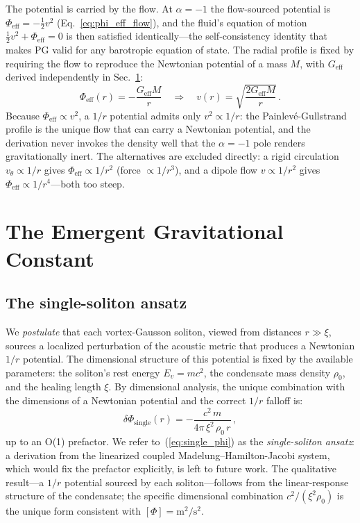 \documentclass[12pt, a4paper]{article}
\newcommand{\Geff}{G_{\mathrm{eff}}}
\newcommand{\Phieff}{\Phi_{\mathrm{eff}}}
\begin{document}
The potential is carried by the flow. At $\alpha=-1$ the flow-sourced potential is $\Phieff = -\tfrac{1}{2}v^2$ (Eq.~\ref{eq:phi_eff_flow}), and the fluid's equation of motion $\tfrac12 v^2 + \Phieff = 0$ is then satisfied identically---the self-consistency identity that makes PG valid for any barotropic equation of state. The radial profile is fixed by requiring the flow to reproduce the Newtonian potential of a mass $M$, with $\Geff$ derived independently in Sec.~\ref{sec:G_eff}:
\begin{equation}
    \Phieff(r) = -\frac{\Geff M}{r}
    \quad\Longrightarrow\quad
    v(r) = \sqrt{\frac{2\Geff M}{r}}\,.
\label{eq:pg_from_flow}
\end{equation}
Because $\Phieff \propto v^2$, a $1/r$ potential admits only $v^2 \propto 1/r$: the Painlev\'{e}-Gullstrand profile is the unique flow that can carry a Newtonian potential, and the derivation never invokes the density well that the $\alpha=-1$ pole renders gravitationally inert. The alternatives are excluded directly: a rigid circulation $v_\theta \propto 1/r$ gives $\Phieff \propto 1/r^2$ (force $\propto 1/r^3$), and a dipole flow $v \propto 1/r^2$ gives $\Phieff \propto 1/r^4$---both too steep.


\section{The Emergent Gravitational Constant}
\label{sec:G_eff}

\subsection{The single-soliton ansatz}

We \emph{postulate} that each vortex-Gausson soliton, viewed from distances $r \gg \xi$, sources a localized perturbation of the acoustic metric that produces a Newtonian $1/r$ potential. The dimensional structure of this potential is fixed by the available parameters: the soliton's rest energy $E_v = mc^2$, the condensate mass density $\rho_0$, and the healing length $\xi$. By dimensional analysis, the unique combination with the dimensions of a Newtonian potential and the correct $1/r$ falloff is:
\begin{equation}
    \delta\Phi_{\mathrm{single}}(r) = -\frac{c^2\,m}{4\pi\,\xi^2\,\rho_0\,r}\,,
\label{eq:single_phi}
\end{equation}
up to an O(1) prefactor. We refer to~(\ref{eq:single_phi}) as the \emph{single-soliton ansatz}: a derivation from the linearized coupled Madelung--Hamilton-Jacobi system, which would fix the prefactor explicitly, is left to future work. The qualitative result---a $1/r$ potential sourced by each soliton---follows from the linear-response structure of the condensate; the specific dimensional combination $c^2/(\xi^2\rho_0)$ is the unique form consistent with $[\Phi] = \mathrm{m}^2/\mathrm{s}^2$.
\end{document}
